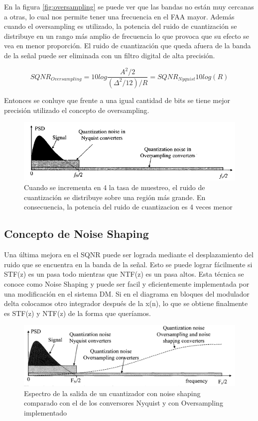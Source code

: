 \documentclass[assd_tp3_main.tex]{subfiles}
\begin{document}
En la figura \ref{fig:oversampling} se puede ver que las bandas no están muy cercanas a otras, lo cual nos permite tener una frecuencia en el FAA mayor.
Además cuando el oversampling es utilizado, la potencia del ruido de cuantización se distribuye en un rango más amplio de frecuencia lo que provoca que su efecto se vea en menor proporción.
El ruido de cuantización que queda afuera de la banda de la señal puede ser eliminada con un filtro digital de alta precisión. 

\[ SQNR_{Oversampling}=10log\frac{A^2/2}{(\Delta^2/12)/R}=SQNR_{Nyquist}10log(R) \]

Entonces se conluye que frente a una igual cantidad de bits se tiene mejor precisión utilizado el concepto de oversampling.

\begin{figure}[H]
\centering
\includegraphics[width=0.8\linewidth]{images/ej4/oversampling_noise.png}
\caption{Cuando se incrementa en 4 la tasa de muestreo, el ruido de cuantización se distribuye sobre una región más grande. En consecuencia, la potencia del ruido de cuantizacion es 4 veces menor}
\label{fig:oversampling_noise}
\end{figure}

\subsection{Concepto de Noise Shaping}
Una última mejora en el SQNR puede ser lograda mediante el desplazamiento del ruido que se encuentra en la banda de la señal. Esto se puede lograr fácilmente si STF(z) es un pasa todo mientras que NTF(z) es un pasa altos.
Esta técnica se conoce como Noise Shaping y puede ser facil y eficientemente implementada por una modificación en el sistema DM. Si en el diagrama en bloques del modulador delta colocamos otro integrador después de la x(n), lo que se obtiene finalmente es STF(z) y NTF(z) de la forma que queríamos.
\begin{figure}[H]
\centering
\includegraphics[width=0.8\linewidth]{images/ej4/noise_shaping.png}
\caption{Espectro de la salida de un cuantizador con noise shaping comparado con el de los conversores Nyquist y con Oversampling implementado }
\label{fig:noise_shaping}
\end{figure}
\end{document}
